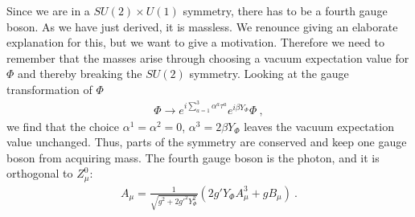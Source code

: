 Since we are in a $SU(2)\times U(1)$ symmetry, there has to be a fourth gauge boson. As we have just derived, it is massless. We renounce giving an elaborate explanation for this, but we want to give a motivation. Therefore we need to remember that the masses arise through choosing a vacuum expectation value for $\Phi$ and thereby breaking the $SU(2)$ symmetry. Looking at the gauge transformation of $\Phi$
\begin{align}
	\Phi\rightarrow e^{i\sum_{a=1}^3\alpha^a\tau^a}e^{i\beta Y_\Phi}\Phi \ ,
\end{align}
we find that the choice $\alpha^1=\alpha^2=0$, $\alpha^3 = 2\beta Y_\Phi$ leaves the vacuum expectation value unchanged. Thus, parts of the symmetry are conserved and keep one gauge boson from acquiring mass. The fourth gauge boson is the photon, and it is orthogonal to $Z_\mu^0$:
\begin{align}
	A_\mu = \frac{1}{\sqrt{g^2 + 2g'^2Y_\Phi^2}}(2g'Y_\Phi A^3_\mu + gB_\mu) \ .
\end{align}

